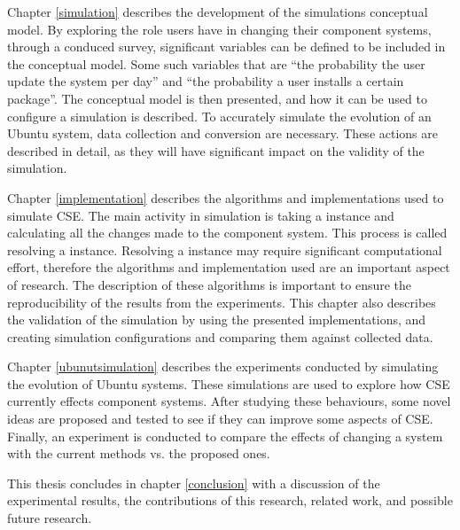 Chapter \ref{simulation} describes the development of the simulations conceptual model.
By exploring the role users have in changing their component systems, through a conduced survey,
significant variables can be defined to be included in the conceptual model.
Some such variables that are ``the probability the user update the system per day'' and ``the probability a user installs a certain package''.
The conceptual model is then presented, and how it can be used to configure a simulation is described.
To accurately simulate the evolution of an Ubuntu system, data collection and conversion  are necessary.
These actions are described in detail, as they will have significant impact on the validity of the simulation.

Chapter \ref{implementation} describes the algorithms and implementations used to simulate CSE.
The main activity in simulation is taking a \modelname instance and calculating all the changes made to the component system.
This process is called resolving a \modelname instance.
Resolving a \modelname instance may require significant computational effort,
therefore the algorithms and implementation used are an important aspect of research.
The description of these algorithms is important to ensure the reproducibility of the results from the experiments.
This chapter also describes the validation of the simulation by using the presented implementations,
and creating simulation configurations and comparing them against collected data.

Chapter \ref{ubunutsimulation} describes the experiments conducted by simulating the evolution of Ubuntu systems.
These simulations are used to explore how CSE currently effects component systems.
After studying these behaviours, some novel ideas are proposed and tested to see if they can improve some aspects of CSE.
Finally, an experiment is conducted to compare the effects of changing a system with the current methods vs. the proposed ones.

This thesis concludes in chapter \ref{conclusion} with a discussion of the experimental results, the contributions of this research, related work, and possible future research.
